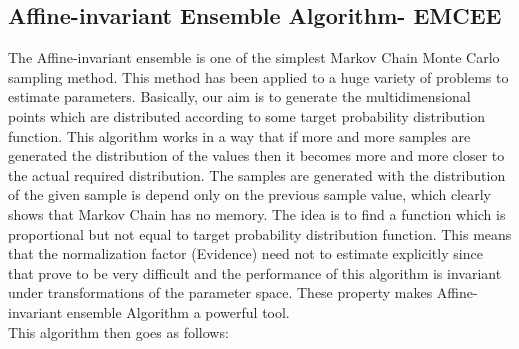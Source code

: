 \documentclass[12pt]{report}
\begin{document}
\subsection{Affine-invariant Ensemble  Algorithm-  EMCEE}
The Affine-invariant ensemble\cite{df2013} is one of the simplest Markov Chain Monte Carlo sampling method. This method has been applied to a huge variety of problems to estimate parameters. Basically, our aim is to generate the multidimensional points which are distributed according to some target probability distribution function. This algorithm works in a way that if more and more samples are generated the distribution of the values then it becomes more and more closer to the actual required distribution. The samples are generated with the distribution of the given sample is depend only on the previous sample value, which clearly shows that Markov Chain  has no memory. The idea is to find a function which is proportional but not equal to target probability distribution function. This means that the normalization factor (Evidence) need not to estimate explicitly since that prove to be very difficult and the performance of this algorithm is invariant under transformations of the parameter space. These property makes Affine-invariant ensemble Algorithm a powerful tool. \\
This algorithm then goes as follows: 
\end{document}
